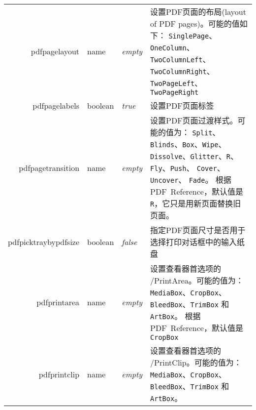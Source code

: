 \documentclass{article}
\begin{document}
\begin{longtable}{@{}>{\ttfamily}r>{\raggedright}p{}>{\itshape}lp{7cm}@{}}
  pdfpagelayout       & name           & empty                     & 设置PDF页面的布局(layout of PDF pages)。可能的值如下：
  \verb|SinglePage|、\verb|OneColumn|、
  \verb|TwoColumnLeft|、\verb|TwoColumnRight|、
  \verb|TwoPageLeft|、\verb|TwoPageRight|                                                                                                                                                                                                                                                          \\
  pdfpagelabels       & boolean        & true                      & 设置PDF页面标签                                                                                                                                                                                                                    \\
  pdfpagetransition   & name           & empty                     & 设置PDF页面过渡样式。可能的值为：
  \verb|Split|、\verb|Blinds|、\verb|Box|、\verb|Wipe|、
  \verb|Dissolve|、\verb|Glitter|、\verb|R|、
  \verb|Fly|、\verb|Push|、
  \verb|Cover|、\verb|Uncover|、
  \verb|Fade|。
  根据PDF~Reference，默认值是 \verb|R|，它只是用新页面替换旧页面。                                                                                                                                                                                                                                                     \\
  pdfpicktraybypdfsize
                      & boolean        & false                     & 指定PDF页面尺寸是否用于选择打印对话框中的输入纸盘                                                                                                                                                                                                   \\
  pdfprintarea        & name           & empty                     & 设置查看器首选项的 /PrintArea。可能的值为：
  \verb|MediaBox|、\verb|CropBox|、
  \verb|BleedBox|、\verb|TrimBox| 和 \verb|ArtBox|。
  根据PDF~Reference，默认值是 \verb|CropBox|                                                                                                                                                                                                                                                             \\
  pdfprintclip        & name           & empty                     & 设置查看器首选项的 /PrintClip。可能的值为：
  \verb|MediaBox|、\verb|CropBox|、
  \verb|BleedBox|、\verb|TrimBox| 和 \verb|ArtBox|。

\end{longtable}
\end{document}
